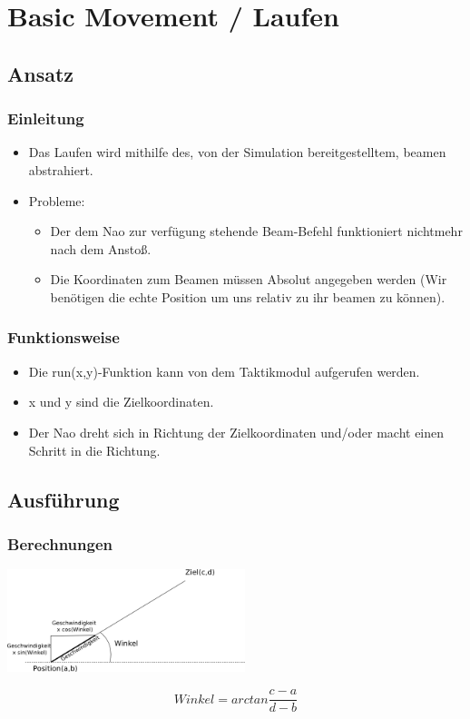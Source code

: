 \section{Basic Movement / Laufen}
\begin{frame}
\tableofcontents[currentsection]
\end{frame}

\subsection{Ansatz}
\frame
{
	\frametitle{Einleitung}
	\begin{itemize}
		\item Das Laufen wird mithilfe des, von der Simulation bereitgestelltem, beamen abstrahiert.
		\item Probleme:
		\begin{itemize}
			\item Der dem Nao zur verfügung stehende Beam-Befehl funktioniert nichtmehr nach dem Anstoß.
			\item Die Koordinaten zum Beamen müssen Absolut angegeben werden (Wir benötigen die echte Position um uns relativ zu ihr beamen zu können).
		\end{itemize}
	\end{itemize}
}

\frame
{
	\frametitle{Funktionsweise}
	\begin{itemize}
		\item Die run(x,y)-Funktion kann von dem Taktikmodul aufgerufen werden.
		\item x und y sind die Zielkoordinaten.
		\item Der Nao dreht sich in Richtung der Zielkoordinaten und/oder macht einen Schritt in die Richtung.
	\end{itemize}
}

\subsection{Ausführung}
\frame
{
	\frametitle{Berechnungen}
	\begin{center}\includegraphics[height=3cm, center]{geschwindigkeit.png}\end{center}
	\begin{equation}
		Winkel = arctan\frac{c-a}{d-b}
	\end{equation}
}

